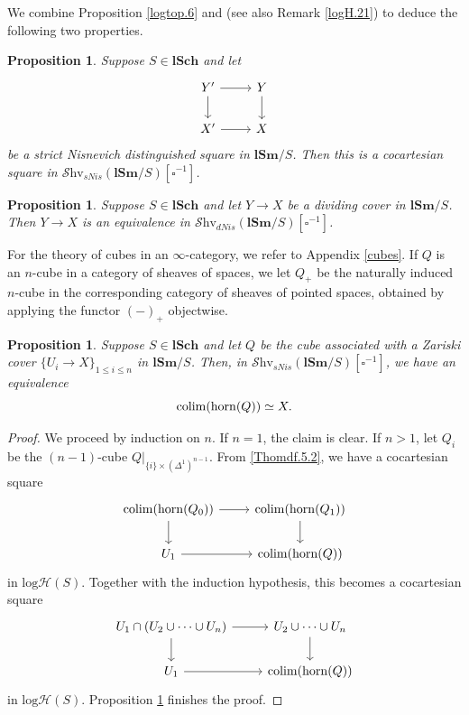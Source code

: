 \documentclass[11pt, a4paper]{amsart}
\newtheorem{prop}[thm]{Proposition}
\theoremstyle{definition}
\numberwithin{equation}{subsection}
\newcommand{\lSch}{\mathbf{lSch}}
\newcommand{\lSm}{\mathbf{lSm}}
\newcommand{\colimit}{\mathop{\rm colim}}
\newcommand{\boxx}{\square}
\newcommand{\infShv}{\mathcal{S}\mathrm{hv}}
\newcommand{\horn}{\mathrm{horn}}
\newcommand{\inflogH}{\mathrm{log}\mathcal{H}}
\begin{document}
We combine Proposition \ref{logtop.6} and \cite[Corollary 5.10]{Vcdtop} (see also Remark \ref{logH.21}) to deduce the following two properties. 

\begin{prop}
\label{logHprop.1}
Suppose $S\in \lSch$ and let 
\[
\begin{tikzcd}
Y'\ar[d]\ar[r]&
Y\ar[d]
\\
X'\ar[r]&
X
\end{tikzcd}
\]
be a strict Nisnevich distinguished square in $\lSm/S$.
Then this is a cocartesian square in $\infShv_{sNis}(\lSm/S)[\boxx^{-1}]$.
\end{prop}


\begin{prop}
\label{logHprop.2}
Suppose $S\in \lSch$ and let $Y\to X$ be a dividing cover in $\lSm/S$.
Then $Y\to X$ is an equivalence in $\infShv_{dNis}(\lSm/S)[\boxx^{-1}]$.
\end{prop}


For the theory of cubes in an $\infty$-category, we refer to Appendix \ref{cubes}.
If $Q$ is an $n$-cube in a category of sheaves of spaces, we let $Q_+$ be the naturally induced $n$-cube in the corresponding category of sheaves of pointed spaces, obtained by applying the functor $(-)_+$ objectwise.

\begin{prop}
\label{logHprop.3}
Suppose $S\in \lSch$ and let $Q$ be the cube associated with a Zariski cover 
$\{U_i\to X\}_{1\leq i\leq n}$ in $\lSm/S$.
Then, in $\infShv_{sNis}(\lSm/S)[\boxx^{-1}]$, we have an equivalence
\[
\colimit(\horn(Q))
\simeq
X.
\]
\end{prop}
\begin{proof}
We proceed by induction on $n$.
If $n=1$, the claim is clear.
If $n>1$, let $Q_i$ be the $(n-1)$-cube $Q|_{\{i\}\times (\Delta^1)^{n-1}}$.
From \eqref{Thomdf.5.2}, we have a cocartesian square
\[
\begin{tikzcd}
\colimit(\horn(Q_0))\ar[d]\ar[r]&
\colimit(\horn(Q_1))\ar[d]
\\
U_1\ar[r]&
\colimit(\horn(Q))
\end{tikzcd}
\]
in $\inflogH(S)$.
Together with the induction hypothesis, this becomes a cocartesian square
\[
\begin{tikzcd}
U_1\cap (U_2\cup \cdots \cup U_n)\ar[d]\ar[r]&
U_2\cup \cdots \cup U_n\ar[d]
\\
U_1\ar[r]&
\colimit(\horn(Q))
\end{tikzcd}
\]
in $\inflogH(S)$.
Proposition \ref{logHprop.1} finishes the proof.
\end{proof}
\end{document}
